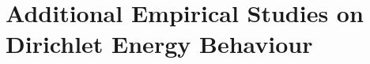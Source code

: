 


\section{Additional Empirical Studies on Dirichlet Energy Behaviour}
\label{sec:Additional_studies}




\clearpage
